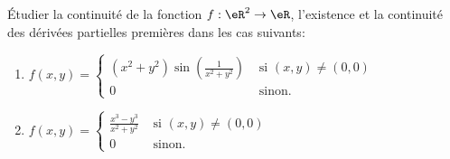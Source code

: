 \begin{exercice}\label{exoCalculDifferentiel0001}

Étudier la continuité de la fonction $f : \eR ^2 \to \eR$, l'existence et la continuité des dérivées partielles premières dans les cas suivants:
\begin{enumerate}
		\item
			\boringexo
			$f(x,y) = \left\{
		         \begin{array}{cc}
         (x^2 + y^2)\sin\displaystyle\left ( \frac{1}{x^2+y^2} \right )& \mbox{ si }(x,y) \neq (0,0) \\
         0 & \mbox{ sinon. }
         \end{array}
         \right .$
 \item
	 \minsyndical
$f(x,y) = \left\{
         \begin{array}{cc}
         \displaystyle\frac{x^3 - y^3}{x^2+y^2}& \mbox{ si }(x,y) \neq (0,0) \\
         0 & \mbox{ sinon. }
         \end{array}
         \right . $


\end{enumerate}
\end{exercice}
